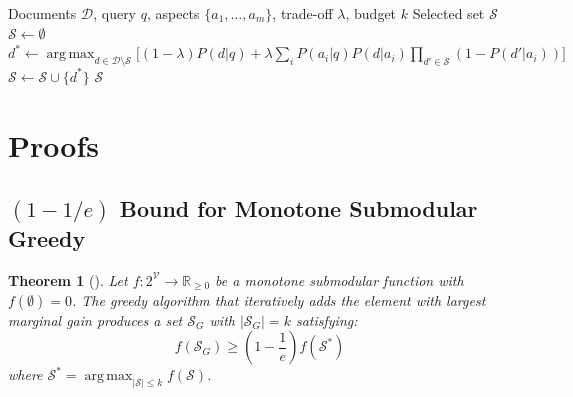 \documentclass[11pt]{article}
\newtheorem{theorem}{Theorem}[section]
\DeclareMathOperator*{\argmax}{arg\,max}
\begin{document}
\begin{algorithm}[H]
\caption{xQuAD: Explicit Query Aspect Diversification~\citep{santos2010exploiting}}
\label{alg:xquad}
\begin{algorithmic}[1]
\Require Documents $\mathcal{D}$, query $q$, aspects $\{a_1,\ldots,a_m\}$, trade-off $\lambda$, budget $k$
\Ensure Selected set $\mathcal{S}$
\State $\mathcal{S} \gets \emptyset$
  \State $d^* \gets \argmax_{d \in \mathcal{D} \setminus \mathcal{S}} \Big[
    (1{-}\lambda) P(d|q) + \lambda \sum_i P(a_i|q) P(d|a_i) \prod_{d' \in \mathcal{S}} (1 - P(d'|a_i))
  \Big]$
  \State $\mathcal{S} \gets \mathcal{S} \cup \{d^*\}$
\EndFor
\State \Return $\mathcal{S}$
\end{algorithmic}
\end{algorithm}


\section{Proofs}
\label{app:proofs}

\subsection{$(1-1/e)$ Bound for Monotone Submodular Greedy}

\begin{theorem}[\citet{nemhauser1978analysis}]
\label{thm:submodular-bound}
Let $f: 2^{\mathcal{V}} \to \mathbb{R}_{\geq 0}$ be a monotone submodular
function with $f(\emptyset) = 0$. The greedy algorithm that iteratively adds
the element with largest marginal gain produces a set $\mathcal{S}_G$ with
$|\mathcal{S}_G| = k$ satisfying:
\begin{equation}
f(\mathcal{S}_G) \geq \left(1 - \frac{1}{e}\right) f(\mathcal{S}^*)
\end{equation}
where $\mathcal{S}^* = \argmax_{|\mathcal{S}| \leq k} f(\mathcal{S})$.
\end{theorem}
\end{document}
